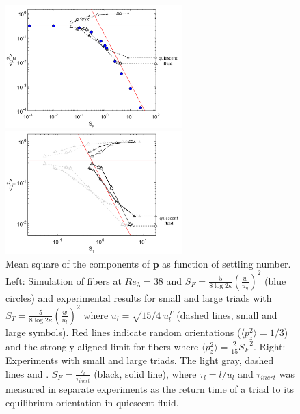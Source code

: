 \documentclass[]{jfm}
\begin{document}
\begin{figure}
\centering
\begin{minipage}{.5\textwidth}
  \centering
  \includegraphics[width=2.7in]{figures/SF_theory.pdf}
\end{minipage}%
\begin{minipage}{.5\textwidth}
  \centering
  \includegraphics[width=2.7in]{figures/SF_experiments.pdf}
\end{minipage}
  \caption{Mean square of the components of $\mathbf{p}$ as function of settling number. Left: Simulation of fibers at $\textit{Re}_{\lambda}{=}38$ and $S_F{=}\frac{5}{8\log{2\kappa}}(\frac{w}{u_{\eta}})^2$ (blue circles) and experimental results for small and large triads with $S_T{=}\frac{5}{8\log{2\kappa}}(\frac{w}{u_{l}})^2$ where $u_l{=}\sqrt{15/4}~u_l^T$ (dashed lines, small and large symbols).  Red lines indicate random orientations ($\langle p_z^2\rangle=1/3$) and the strongly aligned limit for fibers where $\langle p_z^2\rangle=\frac{2}{15}S_F^{-2}$.  Right: Experiments with small and large triads. The light gray, dashed lines and .  $S_F{=}\frac{\tau_l}{\tau_{\textit{inert}}}$ (black, solid line), where $\tau_l{=}l/u_l$ and $\tau_{\textit{inert}}$ was measured in separate experiments as the return time of a triad to its equilibrium orientation in quiescent fluid.}
\label{Fig:mean-square}
\end{figure}
\end{document}
